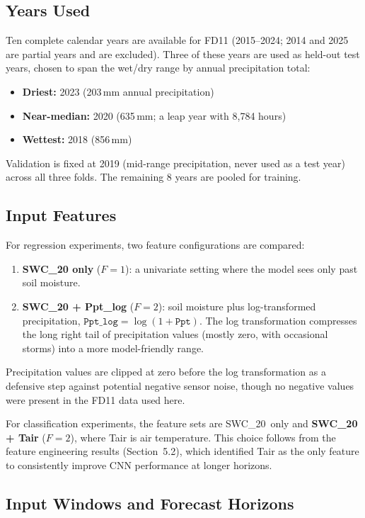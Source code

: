 \documentclass[11pt]{article}
\begin{document}
\subsection{Years Used}

Ten complete calendar years are available for FD11 (2015--2024; 2014 and 2025 are
partial years and are excluded). Three of these years are used as held-out test
years, chosen to span the wet/dry range by annual precipitation total:
\begin{itemize}
    \item \textbf{Driest:} 2023 (203\,mm annual precipitation)
    \item \textbf{Near-median:} 2020 (635\,mm; a leap year with 8{,}784 hours)
    \item \textbf{Wettest:} 2018 (856\,mm)
\end{itemize}
Validation is fixed at 2019 (mid-range precipitation, never used as a test year)
across all three folds. The remaining 8 years are pooled for training.

\subsection{Input Features}

For regression experiments, two feature configurations are compared:
\begin{enumerate}
    \item \textbf{SWC\_20 only} ($F = 1$): a univariate setting where the model sees
    only past soil moisture.
    \item \textbf{SWC\_20 + Ppt\_log} ($F = 2$): soil moisture plus log-transformed
    precipitation, $\texttt{Ppt\_log} = \log(1 + \texttt{Ppt})$. The log
    transformation compresses the long right tail of precipitation values (mostly
    zero, with occasional storms) into a more model-friendly range.
\end{enumerate}
Precipitation values are clipped at zero before the log transformation as a
defensive step against potential negative sensor noise, though no negative values
were present in the FD11 data used here.

For classification experiments, the feature sets are SWC\_20~only and
\textbf{SWC\_20 + Tair} ($F = 2$), where Tair is air temperature. This choice
follows from the feature engineering results (Section~5.2), which identified Tair
as the only feature to consistently improve CNN performance at longer horizons.

\subsection{Input Windows and Forecast Horizons}
\end{document}
